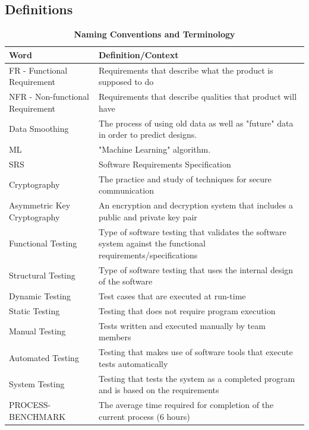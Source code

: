 \documentclass[12pt, titlepage]{article}
\begin{document}
\subsection{Definitions}
\begin{table}[H]
\caption{\bf Naming Conventions and Terminology}
\begin{tabular}{ |p{6cm}|p{8cm}|  } 
 \hline
\bf Word & \bf Definition/Context\\
 \hline
 FR - Functional Requirement & Requirements that describe what the product is supposed to do\\
 \hline
NFR - Non-functional Requirement & Requirements that describe qualities that product will have\\
\hline
Data Smoothing & The process of using old data as well as "future" data in order to predict designs.\\
\hline
ML & "Machine Learning" algorithm.\\
\hline
SRS & Software Requirements Specification\\
\hline
Cryptography & The practice and study of techniques for secure communication\\
\hline
Asymmetric Key Cryptography & An encryption and decryption system that includes a public and private key pair\\
\hline
Functional Testing & Type of software testing that validates the software system against the functional requirements/specifications\\
\hline
Structural Testing & Type of software testing that uses the internal design of the software\\
\hline
Dynamic Testing & Test cases that are executed at run-time\\
\hline
Static Testing & Testing that does not require program execution\\
\hline
Manual Testing & Tests written and executed manually by team members\\
\hline
Automated Testing & Testing that makes use of software tools that execute tests automatically\\
\hline
System Testing & Testing that tests the system as a completed program and is based on the requirements\\
\hline
PROCESS-BENCHMARK & The average time required for completion of the current process (6 hours)\\
\hline
\end{tabular}
\end{table}
\end{document}
